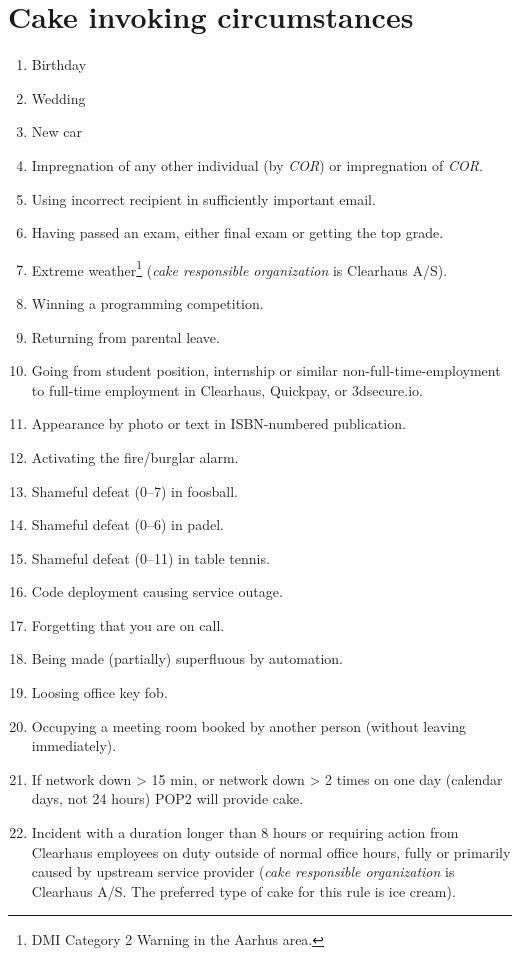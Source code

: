 \documentclass[a4paper, oneside, article]{memoir}
\newcounter{tbc}
\begin{document}
    \chapter{Cake invoking circumstances}\label{chp:circumstances}
    \begin{enumerate}[§ 1]
        \setcounter{enumi}{\value{tbc}}

        \item Birthday
        \item Wedding
        \item New car
        \item Impregnation of any other individual (by \emph{COR}) or impregnation of
        \emph{COR}.
        \item Using incorrect recipient in sufficiently important email.
        \item Having passed an exam, either final exam or getting the top grade.
        \item Extreme weather\footnote{DMI Category 2 Warning in the Aarhus area.} (\emph{cake responsible organization} is Clearhaus A/S).
        \item Winning a programming competition.
        \item Returning from parental leave.
        \item Going from student position, internship or similar non-full-time-employment to full-time employment in Clearhaus, Quickpay, or 3dsecure.io.
        \item Appearance by photo or text in ISBN-numbered publication.
        \item Activating the fire/burglar alarm.
        \item Shameful defeat (0--7) in foosball.
        \item Shameful defeat (0--6) in padel.
        \item Shameful defeat (0--11) in table tennis.
        \item Code deployment causing service outage.
        \item Forgetting that you are on call.
        \item Being made (partially) superfluous by automation.
        \item Loosing office key fob.
        \item Occupying a meeting room booked by another person (without leaving immediately).
        \item If network down > 15 min, or network down > 2 times on one day (calendar days, not 24 hours) POP2 will provide cake.
        \item Incident with a duration longer than 8 hours or requiring action from Clearhaus employees on duty outside of normal office hours, fully or primarily caused by upstream service provider (\emph{cake responsible organization} is Clearhaus A/S. The preferred type of cake for this rule is ice cream).
    \end{enumerate}
\end{document}
